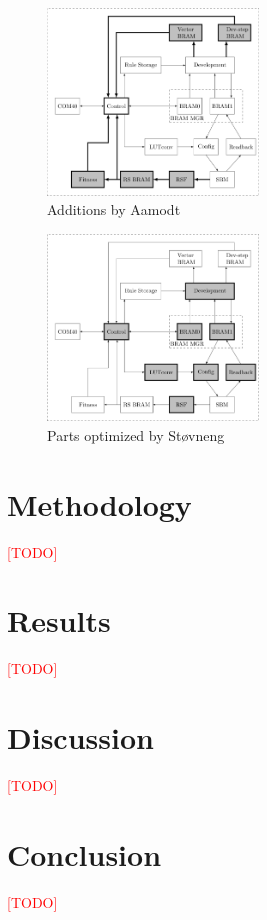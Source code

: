 \documentclass[a4paper]{IEEEtran}
\newcommand\TODO{\textcolor{red}{[TODO]}}
\begin{document}
\begin{figure}[h!]
    \centering
    \includegraphics[width=0.5\textwidth]{figures/ca-aamodt}
    \caption{Additions by Aamodt}
    \label{fig:ca-aamodt}
\end{figure}

\begin{figure}[h!]
    \centering
    \includegraphics[width=0.5\textwidth]{figures/ca-stovneng}
    \caption{Parts optimized by Støvneng}
    \label{fig:ca-stovneng}
\end{figure}

\section{Methodology}

\TODO

\section{Results}

\TODO

\section{Discussion}

\TODO

\section{Conclusion}

\TODO



\end{document}
